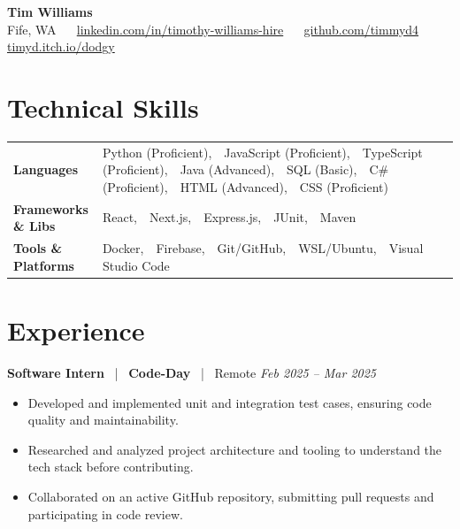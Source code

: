\documentclass[10pt, letterpaper]{article}
\newcommand{\jobhead}[4]{%
  \vspace{5pt}%
  {\bfseries\color{dark}#1}%
  ~{\color{light}|}~%
  {\bfseries\color{navy}#2}%
  ~{\color{light}|}~%
  {\color{light}#3}%
  \hfill{\color{light}\small\textit{#4}}\\[-2pt]%
}
\newcommand{\skillrow}[2]{%
  {\bfseries #1} & #2 \\[2pt]%
}
\begin{document}

\begin{center}
  {\huge\bfseries\color{navy} Tim Williams}\\[4pt]
  {\small\color{light}
    Fife, WA
    ~\textbullet~
    \href{https://linkedin.com/in/timothy-williams-hire}{linkedin.com/in/timothy-williams-hire}
    ~\textbullet~
    \href{https://github.com/timmyd4}{github.com/timmyd4}
    ~\textbullet~
    \href{https://timyd.itch.io/dodgy}{timyd.itch.io/dodgy}
  }
\end{center}

\vspace{2pt}

\section{Technical Skills}

\begin{tabular}{@{}p{1.6in} p{5.2in}@{}}
  \skillrow{Languages}{Python (Proficient),\ \ JavaScript (Proficient),\ \ TypeScript (Proficient),\ \ Java (Advanced),\ \ SQL (Basic),\ \ C\# (Proficient),\ \ HTML (Advanced),\ \ CSS (Proficient)}
  \skillrow{Frameworks \& Libs}{React,\ \ Next.js,\ \ Express.js,\ \ JUnit,\ \ Maven}
  \skillrow{Tools \& Platforms}{Docker,\ \ Firebase,\ \ Git/GitHub,\ \ WSL/Ubuntu,\ \ Visual Studio Code}
\end{tabular}

\section{Experience}

\jobhead{Software Intern}{Code-Day}{Remote}{Feb 2025 – Mar 2025}
\begin{itemize}
  \item Developed and implemented unit and integration test cases, ensuring code quality and maintainability.
  \item Researched and analyzed project architecture and tooling to understand the tech stack before contributing.
  \item Collaborated on an active GitHub repository, submitting pull requests and participating in code review.
\end{itemize}
\end{document}
